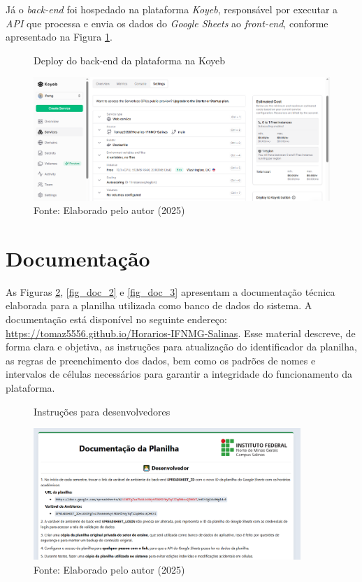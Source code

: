 Já o \textit{back-end} foi hospedado na plataforma \textit{Koyeb}, responsável por executar a \textit{API} que processa e envia os dados do \textit{Google Sheets} ao \textit{front-end}, conforme apresentado na Figura \ref{fig_deploy_2}.

\begin{figure}[htb]
    \centering
    \caption{Deploy do back-end da plataforma na Koyeb}
    \includegraphics[width=1\textwidth]{Figuras/deploy-2.png}
    \caption*{Fonte: Elaborado pelo autor (2025)}
    \label{fig_deploy_2}
\end{figure}

\section{Documentação}

As Figuras \ref{fig_doc_1}, \ref{fig_doc_2} e \ref{fig_doc_3} apresentam a documentação técnica elaborada para a planilha utilizada como banco de dados do sistema. A documentação está disponível no seguinte endereço: \url{https://tomaz5556.github.io/Horarios-IFNMG-Salinas}. Esse material descreve, de forma clara e objetiva, as instruções para atualização do identificador da planilha, as regras de preenchimento dos dados, bem como os padrões de nomes e intervalos de células necessários para garantir a integridade do funcionamento da plataforma.

\begin{figure}[htb]
    \centering
    \caption{Instruções para desenvolvedores}
    \includegraphics[width=0.9\textwidth]{Figuras/doc-1.png}
    \caption*{Fonte: Elaborado pelo autor (2025)}
    \label{fig_doc_1}
\end{figure}

